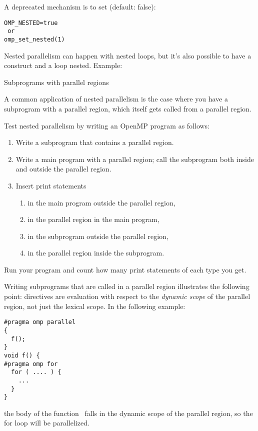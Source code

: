 \begin{remark}
  A deprecated mechanism is to
  set  (default: false):
\begin{verbatim}
OMP_NESTED=true
 or
omp_set_nested(1)
\end{verbatim}
\end{remark}

Nested parallelism can happen with nested loops,
but it's also possible to have a  construct
and a loop nested.
Example:

 {Subprograms with parallel regions}

A common application of nested parallelism is the case
where you have a subprogram with a parallel region,
which itself gets called from a parallel region.

\begin{exercise}
  Test nested parallelism by writing an OpenMP program as follows:
  \begin{enumerate}
  \item Write a subprogram that contains a parallel region.
  \item\label{ex:nest:sub} Write a main program with a parallel region; call the subprogram both inside and outside the parallel region.
    \item Insert print statements 
      \begin{enumerate}
      \item in the main program outside the parallel region,
      \item in the parallel region in the main program,
      \item\label{ex:nest:sub:sub} in the subprogram outside the parallel region,
      \item in the parallel region inside the subprogram.
      \end{enumerate}
  \end{enumerate}
  Run your program and count how many print statements of each type you get.
\end{exercise}

Writing subprograms that are called in a parallel region illustrates
the following point: directives are evaluation with respect to the
\emph{dynamic scope} of the
parallel region, not just the lexical scope. In the following example:
\begin{lstlisting}
#pragma omp parallel
{
  f();
}
void f() {
#pragma omp for
  for ( .... ) {
    ...
  }
}
\end{lstlisting}
the body of the function~ falls in the dynamic scope of the
parallel region, so the for loop will be parallelized.


